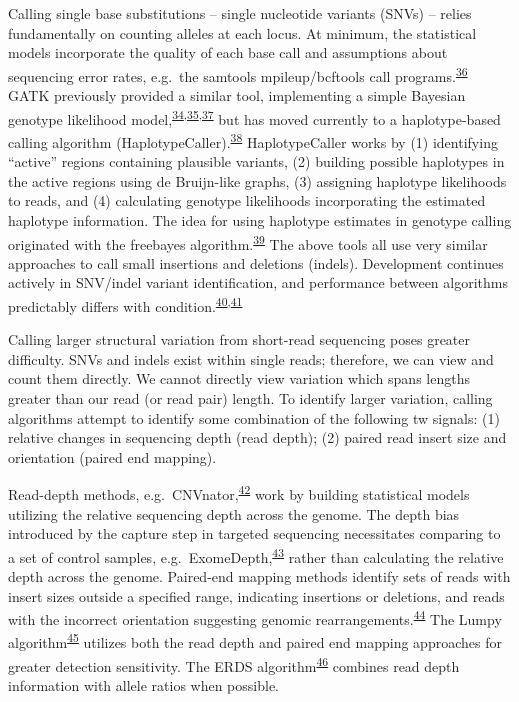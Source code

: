 \documentclass[11pt,letterpaper]{book}
\begin{document}
Calling single base substitutions -- single nucleotide variants (SNVs) -- relies fundamentally on counting alleles at each locus.
At minimum, the statistical models incorporate the quality of each base call and assumptions about sequencing error rates, e.g.~the samtools mpileup/bcftools call programs.\textsuperscript{\protect\hyperlink{ref-li:2011aa}{36}}
GATK previously provided a similar tool, implementing a simple Bayesian genotype likelihood model,\textsuperscript{\protect\hyperlink{ref-mckenna:2010aa}{34},\protect\hyperlink{ref-depristo:2011aa}{35},\protect\hyperlink{ref-van-der-auwera:2013aa}{37}} but has moved currently to a haplotype-based calling algorithm (HaplotypeCaller).\textsuperscript{\protect\hyperlink{ref-poplin:2018aa}{38}}
HaplotypeCaller works by (1) identifying ``active'' regions containing plausible variants, (2) building possible haplotypes in the active regions using de Bruijn-like graphs, (3) assigning haplotype likelihoods to reads, and (4) calculating genotype likelihoods incorporating the estimated haplotype information.
The idea for using haplotype estimates in genotype calling originated with the freebayes algorithm.\textsuperscript{\protect\hyperlink{ref-garrison:2012aa}{39}}
The above tools all use very similar approaches to call small insertions and deletions (indels).
Development continues actively in SNV/indel variant identification, and performance between algorithms predictably differs with condition.\textsuperscript{\protect\hyperlink{ref-chen:2019aa}{40},\protect\hyperlink{ref-xu:2018aa}{41}}

Calling larger structural variation from short-read sequencing poses greater difficulty.
SNVs and indels exist within single reads; therefore, we can view and count them directly.
We cannot directly view variation which spans lengths greater than our read (or read pair) length.
To identify larger variation, calling algorithms attempt to identify some combination of the following tw signals: (1) relative changes in sequencing depth (read depth); (2) paired read insert size and orientation (paired end mapping).

Read-depth methods, e.g.~CNVnator,\textsuperscript{\protect\hyperlink{ref-abyzov:2011aa}{42}} work by building statistical models utilizing the relative sequencing depth across the genome.
The depth bias introduced by the capture step in targeted sequencing necessitates comparing to a set of control samples, e.g.~ExomeDepth,\textsuperscript{\protect\hyperlink{ref-plagnol:2012aa}{43}} rather than calculating the relative depth across the genome.
Paired-end mapping methods identify sets of reads with insert sizes outside a specified range, indicating insertions or deletions, and reads with the incorrect orientation suggesting genomic rearrangements.\textsuperscript{\protect\hyperlink{ref-korbel:2007aa}{44}}
The Lumpy algorithm\textsuperscript{\protect\hyperlink{ref-layer:2014aa}{45}} utilizes both the read depth and paired end mapping approaches for greater detection sensitivity.
The ERDS algorithm\textsuperscript{\protect\hyperlink{ref-zhu:2012aa}{46}} combines read depth information with allele ratios when possible.
\end{document}
